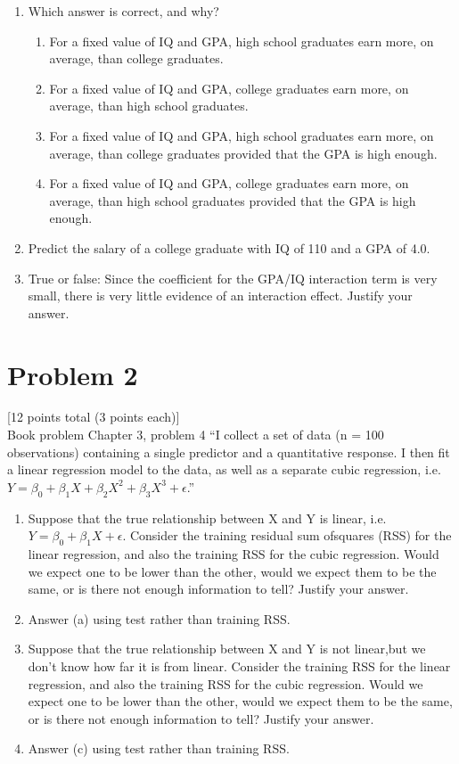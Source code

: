 \documentclass[12pt]{article}
\begin{document}
\begin{enumerate}
    \item Which answer is correct, and why?
          \begin{enumerate}[label=(\roman*)]
              \item For a fixed value of IQ and GPA, high school graduates earn more, on average, than college graduates.
              \item For a fixed value of IQ and GPA, college graduates earn more, on average, than high school graduates.
              \item For a fixed value of IQ and GPA, high school graduates earn more, on average, than college graduates provided that the GPA is high enough.
              \item For a fixed value of IQ and GPA, college graduates earn more, on average, than high school graduates provided    that the GPA is high enough.
          \end{enumerate}
    \item Predict the salary of a college graduate with IQ of 110 and a GPA of 4.0.
    \item True or false: Since the coefficient for the GPA/IQ interaction term is very small, there is very little evidence of an interaction effect. Justify your answer.
\end{enumerate}
\pagebreak
\section{Problem 2}
 [12 points total (3 points each)]\\
Book problem Chapter 3, problem 4 “I collect a set of data (n = 100 observations) containing a single predictor and a quantitative response. I then fit a linear regression model to the data, as well as a separate cubic regression, i.e. $Y = \beta_0 + \beta_1X + \beta_2X^2 + \beta_3X^3 + \epsilon$.”

\begin{enumerate}
    \item Suppose that the true relationship between X and Y is linear, i.e. $Y = \beta_0 + \beta_1X + \epsilon$.  Consider the training residual sum ofsquares (RSS) for the linear regression, and also the training RSS for the cubic regression. Would we expect one to be lower than the other, would we expect them to be the same, or is there not enough information to tell? Justify your answer.
    \item Answer (a) using test rather than training RSS.
    \item Suppose that the true relationship between X and Y is not linear,but we don't know how far it is from linear. Consider the training RSS for the linear regression, and also the training RSS for the cubic regression. Would we expect one to be lower than the other, would we expect them to be the same, or is there not enough information to tell? Justify your answer.
    \item Answer (c) using test rather than training RSS.
\end{enumerate}
\end{document}
